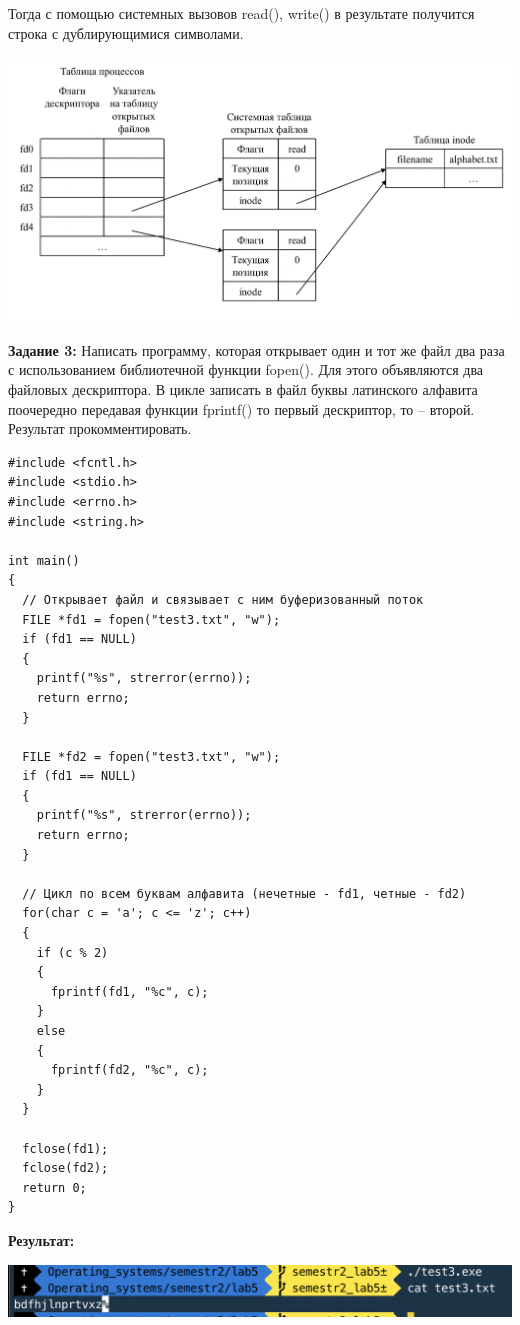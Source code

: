 \documentclass[a4paper,14pt]{extreport} %
\begin{document}
Тогда с помощью системных вызовов read(), write() в результате получится строка с дублирующимися символами. 

\includegraphics[scale=0.7]{shema2}

\newpage

\textbf{Задание 3:} Написать программу, которая открывает один и тот же файл два раза с использованием библиотечной функции fopen(). Для этого объявляются два файловых дескриптора. В цикле записать в файл буквы латинского алфавита поочередно передавая функции fprintf() то первый дескриптор, то – второй.
Результат прокомментировать.

\begin{lstlisting}[]
#include <fcntl.h>
#include <stdio.h>
#include <errno.h>
#include <string.h>

int main()
{
  // Открывает файл и связывает с ним буферизованный поток
  FILE *fd1 = fopen("test3.txt", "w");
  if (fd1 == NULL)
  {
    printf("%s", strerror(errno));
    return errno;
  }

  FILE *fd2 = fopen("test3.txt", "w");
  if (fd1 == NULL)
  {
    printf("%s", strerror(errno));
    return errno;
  }

  // Цикл по всем буквам алфавита (нечетные - fd1, четные - fd2)
  for(char c = 'a'; c <= 'z'; c++)
  {
    if (c % 2)
    {
      fprintf(fd1, "%c", c);
    }
    else
    {
      fprintf(fd2, "%c", c);
    }
  }

  fclose(fd1);
  fclose(fd2);
  return 0;
}
\end{lstlisting}

\textbf{Результат:}

\includegraphics[scale=0.9]{3}
\end{document}
